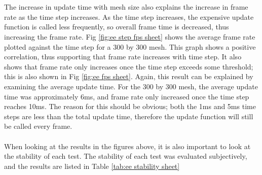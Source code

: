 \\\\The increase in update time with mesh size also explains the increase in frame rate as the time step increases. As the time step increases, the expensive update function is called less frequently, so overall frame time is decreased, thus increasing the frame rate. Fig \ref{fig:ee step fps sheet} shows the average frame rate plotted against the time step for a 300 by 300 mesh. This graph shows a positive correlation, thus supporting that frame rate increases with time step. It also shows that frame rate only increases once the time step exceeds some threshold; this is also shown in Fig \ref{fig:ee fps sheet}. Again, this result can be explained by examining the average update time. For the 300 by 300 mesh, the average update time was approximately 6ms, and frame rate only increased once the time step reaches 10ms. The reason for this should be obvious; both the 1ms and 5ms time steps are less than the total update time, therefore the update function will still be called every frame.
\\\\When looking at the results in the figures above, it is also important to look at the stability of each test. The stability of each test was evaluated subjectively, and the results are listed in Table \ref{tab:ee stability sheet}
